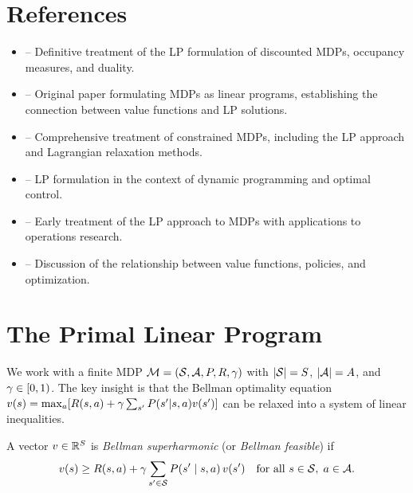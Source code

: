 \documentclass[11pt,a4paper]{article}
\begin{document}

\section{References}
\label{sec:references}

\begin{itemize}
    \item \citet[Chapter 6, Sections 6.9--6.10]{puterman2014} --
    Definitive treatment of the LP formulation of discounted MDPs,
    occupancy measures, and duality.
    \item \citet{manne1960} -- Original paper formulating MDPs as
    linear programs, establishing the connection between value
    functions and LP solutions.
    \item \citet{altman1999} -- Comprehensive treatment of
    constrained MDPs, including the LP approach and Lagrangian
    relaxation methods.
    \item \citet[Chapter 1]{bertsekas2012} -- LP formulation in
    the context of dynamic programming and optimal control.
    \item \citet{derman1970} -- Early treatment of the LP approach
    to MDPs with applications to operations research.
    \item \citet[Chapter 6]{suttonbarto2018} -- Discussion of the
    relationship between value functions, policies, and optimization.
\end{itemize}


\section{The Primal Linear Program}
\label{sec:primal-lp}

We work with a finite MDP
$\mathcal{M} = (\mathcal{S}, \mathcal{A}, P, R, \gamma)$ with
$|\mathcal{S}| = S$, $|\mathcal{A}| = A$, and $\gamma \in [0,1)$.
The key insight is that the Bellman optimality equation
$v(s) = \max_a [R(s,a) + \gamma \sum_{s'} P(s'|s,a) v(s')]$
can be relaxed into a system of linear inequalities.

\begin{definition}
\label{def:bellman-feasible}
A vector $v \in \mathbb{R}^S$ is \emph{Bellman superharmonic} (or
\emph{Bellman feasible}) if
\begin{equation}
\label{eq:bellman-ineq}
    v(s) \geq R(s,a) + \gamma \sum_{s' \in \mathcal{S}}
    P(s' \mid s,a)\, v(s') \quad
    \text{for all } s \in \mathcal{S}, \; a \in \mathcal{A}.
\end{equation}
\end{definition}
\end{document}
